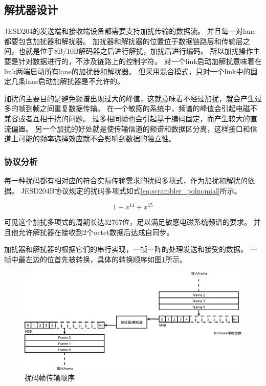 \documentclass[UTF8]{ctexart}
\begin{document}
\subsection{解扰器设计}

JESD204的发送端和接收端设备都需要支持加扰传输的数据流。
并且每一对lane都要包含加扰器和解扰器。
加扰器和解扰器的位置位于数据链路层和传输层之间，也就是位于8B/10B解码器之后进行解扰，加扰后进行编码。
所以加扰操作主要是针对数据进行的，不涉及链路上的控制字符。
对一个link启动加解扰意味着在link两端启动所有lane的加扰器和解扰器。
但采用混合模式，只对一个link中的固定几条lane启动加解扰器是不允许的。

加扰的主要目的是避免频谱出现过大的峰值，这就意味着不经过加扰，就会产生过多的帧到帧之间重复数据传输。
在一个敏感的系统中，频谱的峰值会引起电磁不兼容或者互相干扰的问题。
过多相同帧也会引起基于编码固定，而产生较大的直流偏置。
另一个加扰的好处就是使传输信道的频谱和数据区分离，这样接口和信道上可能的频率选择效应就不会影响到数据的独立性。

\subsubsection{协议分析}

每一种扰码都有相对应的符合实际传输需求的扰码多项式，作为加扰和解扰的依据。
JESD204B协议规定的扰码多项式如式\ref{eq:scrambler_polnomial}所示。

\begin{equation}
\label{eq:scrambler_polnomial}
1+x^{14}+x^{15}
\end{equation}

可见这个加扰多项式的周期长达32767位，足以满足敏感电磁系统频谱的要求。
并且他允许解扰器在接收到2个octet数据后达成自同步。

加扰器和解扰器的根据它们的串行实现，一帧一阵的处理发送和接受的数据。
一帧中最左边的位首先被转换，具体的转换顺序如图\ref{fig:serial_scrambling}所示。

\begin{figure}[H]
\centering
\includegraphics[width=18cm]{./img/serial_scrambling.pdf}
\caption{扰码帧传输顺序}
\label{fig:serial_scrambling}
\end{figure}
\end{document}
